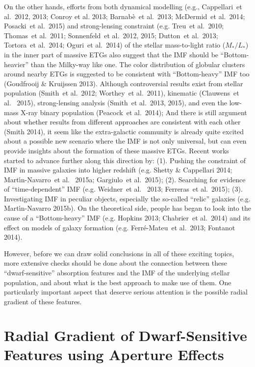 \documentclass[preprint]{aastex}
\def\etal{{\ et al.~}}
\def\m2l{$M_{\ast}/L_{\ast}$}
\begin{document}
\begin{CJK*}{UTF8}{gbsn}
  On the other hands, efforts from both dynamical modelling (e.g., 
  Cappellari\etal 2012, 2013; Conroy et al. 2013;  Barnab{\`e}\etal 2013; 
  McDermid\etal 2014; Posacki\etal 2015) and strong-lensing constraint 
  (e.g. Treu\etal 2010; Thomas\etal 2011; Sonnenfeld\etal 2012, 2015; 
  Dutton\etal 2013; Tortora\etal 2014; Oguri\etal 2014) of the stellar 
  mass-to-light ratio (\m2l) in the inner part of massive ETGs
  also suggest that the IMF should be ``Bottom-heavier'' than the Milky-way
  like one.  The color distribution of globular clusters around nearby ETGs is 
  suggested to be consistent with ``Bottom-heavy'' IMF too (Goudfrooij \& 
  Kruijssen 2013).  Although controversial results exist from stellar 
  population (Smith\etal 2012; Worthey\etal 2011), kinematic (Clauwens\etal
  2015), strong-lensing analysis (Smith\etal 2013, 2015), and even the
  low-mass X-ray binary population (Peacock\etal 2014); And there is still 
  argument about whether results from different approaches are consistent
  with each other (Smith 2014), it seem like the extra-galactic community 
  is already quite excited about a possible new scenario where the IMF is 
  not only universal, but can even provide insights about the formation of
  these massive ETGs.  Recent works started to advance further along this 
  direction by: 
  (1). Pushing the constraint of IMF in massive galaxies into higher 
       redshift (e.g. Shetty \& Cappellari 2014; Mart{\'{\i}}n-Navarro\etal 
       2015a; Gargiulo\etal 2015); 
  (2). Searching for evidence of ``time-dependent'' IMF (e.g. Weidner\etal 
       2013; Ferreras\etal 2015); 
  (3). Investigating IMF in peculiar objects, especially the so-called 
       ``relic'' galaxies (e.g. Mart{\'{\i}}n-Navarro 2015b).  
  On the theoretical side, people has began to look into the cause of a 
  ``Bottom-heavy'' IMF (e.g. Hopkins 2013; Chabrier\etal 2014) 
  and its effect on models of galaxy formation 
  (e.g. Ferr{\'e}-Mateu\etal 2013; Fontanot 2014).  

  However, before we can draw solid conclusions in all of these 
  exciting topics, more extensive checks should be done about the 
  connection between these ``dwarf-sensitive'' absorption features
  and the IMF of the underlying stellar population, and about what is 
  the best approach to make use of them.  One particularly important
  aspect that deserve serious attention is the possible radial 
  gradient of these features. 

\section{Radial Gradient of Dwarf-Sensitive Features using 
 Aperture Effects} 
 

\end{CJK*}
\end{document}
